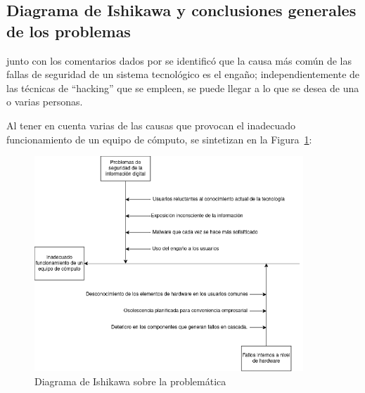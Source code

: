 \textcite{He2023}

\subsection{Diagrama de Ishikawa y conclusiones generales de los problemas}

\textcite{CanoMartinez2022} junto con los comentarios dados por
\textcite{Nurul2021} se identificó que la causa más común de las fallas de
seguridad de un sistema tecnológico es el engaño; independientemente de las
técnicas de ``hacking'' que se empleen, se puede llegar a lo que se desea de
una o varias personas.

Al tener en cuenta varias de las causas que provocan el inadecuado
funcionamiento de un equipo de cómputo, se sintetizan en la
Figura~\ref{fig:fish}:

\begin{figure}[htb]
  \centering
  \includegraphics[width=0.9\textwidth]{./pictures/diagrama.png}
  \caption{Diagrama de Ishikawa sobre la problemática}
  \label{fig:fish}
\end{figure} 
